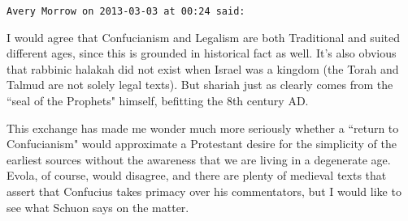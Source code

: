 \begin{footnotesize}
\begin{sffamily}
\texttt{Avery Morrow on 2013-03-03 at 00:24 said: }

I would agree that Confucianism and Legalism are both Traditional and suited different ages, since this is grounded in historical fact as well. It's also obvious that rabbinic halakah did not exist when Israel was a kingdom (the Torah and Talmud are not solely legal texts). But shariah just as clearly comes from the ``seal of the Prophets" himself, befitting the 8th century AD.

This exchange has made me wonder much more seriously whether a ``return to Confucianism" would approximate a Protestant desire for the simplicity of the earliest sources without the awareness that we are living in a degenerate age. Evola, of course, would disagree, and there are plenty of medieval texts that assert that Confucius takes primacy over his commentators, but I would like to see what Schuon says on the matter.


\end{sffamily}\end{footnotesize}
